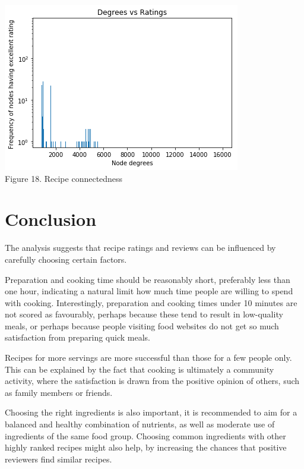 \documentclass[11pt]{article}
\begin{document}
\vspace{5mm}
\begin{center}
\includegraphics[scale=0.3]{graph} \\
\label{graph-degrees} Figure 18. Recipe connectedness
\end{center}
\vspace{5mm}

\section{Conclusion}

The analysis suggests that recipe ratings and reviews can be influenced by carefully choosing certain factors. 

Preparation and cooking time should be reasonably short, preferably less than one hour, indicating a natural limit how much time people are willing to spend with cooking. Interestingly, preparation and cooking times under 10 minutes are not scored as favourably, perhaps because these tend to result in low-quality meals, or perhaps because people visiting food websites do not get so much satisfaction from preparing quick meals.

Recipes for more servings are more successful than those for a few people only. This can be explained by the fact that cooking is ultimately a community activity, where the satisfaction is drawn from the positive opinion of others, such as family members or friends.

Choosing the right ingredients is also important, it is recommended to aim for a balanced and healthy combination of nutrients, as well as moderate use of ingredients of the same food group. Choosing common ingredients with other highly ranked recipes might also help, by increasing the chances that positive reviewers find similar recipes.
\end{document}
